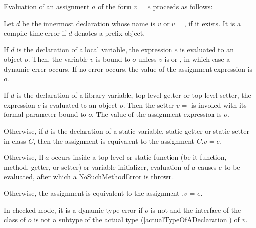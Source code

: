 \documentclass{article}
\newcommand{\code}[1]{{\sf #1}}
\begin{document}
\LMHash{}
Evaluation of an assignment $a$ of the form $v$ \code{=} $e$ proceeds as follows:




\LMHash{}
Let $d$ be the innermost declaration whose name is $v$ or $v=$, if it exists.
It is a compile-time error if $d$ denotes a prefix object.

\LMHash{}
If $d$ is the declaration of a local variable, the expression $e$ is evaluated to an object $o$. Then, the variable $v$ is bound to $o$ unless $v$ is \FINAL{} or \CONST{}, in which case a dynamic error occurs.
If no error occurs, the value of the assignment expression is $o$.


\LMHash{}
If $d$ is the declaration of a library variable, top level getter or top level setter, the expression $e$ is evaluated to an object $o$. Then the setter $v=$ is invoked with its formal parameter bound to $o$. The value of the assignment expression is $o$.

\LMHash{}
Otherwise, if $d$ is the declaration of a static variable, static getter or static setter in class $C$, then the assignment is equivalent to the assignment \code{$C.v$ = $e$}.

\LMHash{}
Otherwise, If  $a$ occurs inside a top level or static function (be it function, method, getter,  or setter) or variable initializer, evaluation of $a$ causes $e$ to be evaluated, after which a \code{NoSuchMethodError} is thrown.

\LMHash{}
Otherwise, the assignment is equivalent to the assignment \code{ \THIS{}.$v$ = $e$}.

\LMHash{}
In checked mode, it is a dynamic type error if $o$ is not \NULL{} and the interface of the class of $o$ is not a subtype of the actual type (\ref{actualTypeOfADeclaration}) of $v$.
\end{document}
